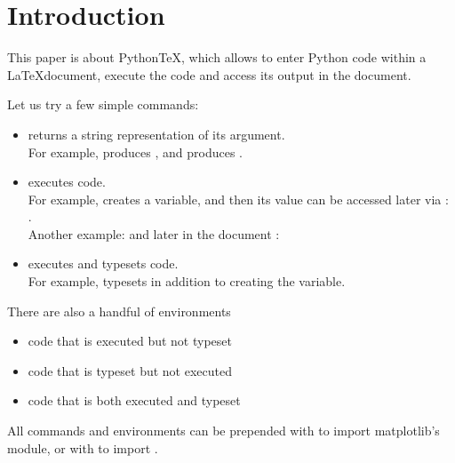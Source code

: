 \documentclass{aa}
\newcommand{\pytex}{Python\TeX}
\begin{document}
\section{Introduction}

  This paper is about \pytex, which allows to enter Python code within a \LaTeX document, execute the code and access its output in the document.

  Let us try a few simple commands:

  \begin{itemize}
    \item {} returns a string representation of its argument. \\ For example,  produces , and  produces .
    \\

    \item {} executes code. \\
    For example,   creates a variable, and then its value can be accessed later via : .\\
    Another example:   and later in the document : 
    \\

    \item {} executes and typesets code.\\
    For example,  typesets  in addition to creating the variable.
  \end{itemize}

  There are also a handful of environments

  \begin{itemize}
    \item {} code that is executed but not typeset
    \item {} code that is typeset but not executed
    \item {} code that is both executed and typeset
  \end{itemize}

  All commands and environments can be prepended with  to import matplotlib's  module, or with  to import .
  
\end{document}
